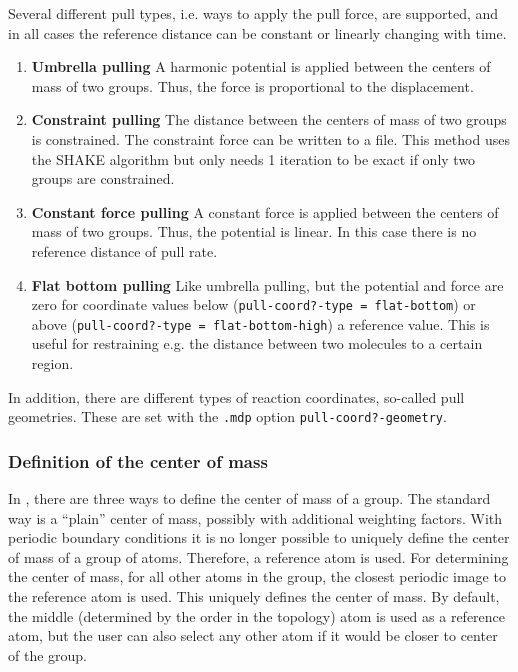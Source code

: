 Several different pull types, i.e. ways to apply the pull force, are supported,
and in all cases the reference distance can be constant
or linearly changing with time.
\begin{enumerate}
\item{\textbf{Umbrella pulling}}
A harmonic potential is applied between
the centers of mass of two groups.
Thus, the force is proportional to the displacement.
\item{\textbf{Constraint pulling}}
The distance between the centers of mass of two groups is constrained.
The constraint force can be written to a file.
This method uses the SHAKE algorithm but only needs 1 iteration to be
exact if only two groups are constrained. 
\item{\textbf{Constant force pulling}}
A constant force is applied between the centers of mass of two groups.
Thus, the potential is linear.
In this case there is no reference distance of pull rate.
\item{\textbf{Flat bottom pulling}}
Like umbrella pulling, but the potential and force are zero for
coordinate values below ({\tt pull-coord?-type = flat-bottom}) or above
({\tt pull-coord?-type = flat-bottom-high}) a reference value.
This is useful for restraining e.g. the distance
between two molecules to a certain region.
\end{enumerate}
In addition, there are different types of reaction coordinates, so-called pull geometries.
These are set with the {\tt .mdp} option {\tt pull-coord?-geometry}.

\subsubsection{Definition of the center of mass}

In {\gromacs}, there are three ways to define the center of mass of a group.
The standard way is a ``plain'' center of mass, possibly with additional
weighting factors. With periodic boundary conditions it is no longer
possible to uniquely define the center of mass of a group of atoms.
Therefore, a reference atom is used. For determining the center of mass,
for all other atoms in the group, the closest periodic image to the reference
atom is used. This uniquely defines the center of mass.
By default, the middle (determined by the order in the topology) atom
is used as a reference atom, but the user can also select any other atom
if it would be closer to center of the group.

